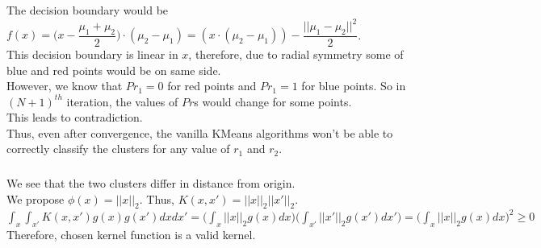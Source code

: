 \documentclass[12pt, fleqn]{article}
\begin{document}
The decision boundary would be $f(x) = \bigg(x - \dfrac{\mu_1 + \mu_2}{2}\bigg) \cdot (\mu_2 - \mu_1) = (x \cdot (\mu_2 - \mu_1)) - \dfrac{||\mu_1 - \mu_2||^2}{2}$. \\
This decision boundary is linear in $x$, therefore, due to radial symmetry some of blue and red points would be on same side. \\
However, we know that $Pr_1 = 0$ for red points and $Pr_1 = 1$ for blue points. So in $(N+1)^{th}$ iteration, the values of $Pr$s would change for some points. \\

This leads to contradiction. \\
Thus, even after convergence, the vanilla KMeans algorithms won't be able to correctly classify the clusters for any value of $r_1$ and $r_2$.

\subsubsection{}
We see that the two clusters differ in distance from origin. \\
We propose $\phi(x) = ||x||_2$. Thus, $K(x, x') = ||x||_2 ||x'||_2$. \\
$\int_x \int_{x'} K(x, x') g(x) g(x') dx dx' = \bigg( \int_x ||x||_2 g(x) dx \bigg) \bigg( \int_{x'} ||x'||_2 g(x') dx' \bigg) = \bigg( \int_x ||x||_2 g(x) dx \bigg)^2 \ge 0$ \\
Therefore, chosen kernel function is a valid kernel.
\end{document}
